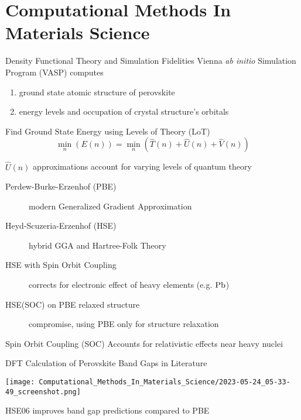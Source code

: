 \documentclass[10pt, aspectratio=169, presentation]{beamer}
\begin{document}
\section{Computational Methods In Materials Science}
\label{sec:org0c138b5}
\begin{frame}[label={sec:org1ee19d0}]{Density Functional Theory and Simulation Fidelities}
Vienna \emph{ab initio} Simulation Program (VASP)\autocite{kresse-1996-effic-iterat} computes
\begin{enumerate}
\item ground state atomic structure of perovskite
\item energy levels and occupation of crystal structure's orbitals
\end{enumerate}

\begin{block}{Find Ground State Energy using Levels of Theory (LoT)}
\[
\min_n(E(n)) = \min_n(\hat{T}(n) + \hat{U}(n) + \hat{V}(n))
\]

\(\hat{U}(n)\) approximations account for varying levels of quantum theory 

\begin{description}
\item[{Perdew-Burke-Erzenhof (PBE)}] modern Generalized Gradient Approximation
\item[{Heyd-Scuzeria-Erzenhof (HSE)}] hybrid GGA and Hartree-Folk Theory
\item[{HSE with Spin Orbit Coupling}] corrects for electronic effect of heavy elements (e.g. \(\ce{Pb}\))
\item[{HSE(SOC) on PBE relaxed structure}] compromise, using PBE only for structure relaxation
\end{description}

Spin Orbit Coupling (SOC) Accounts for relativistic effects near heavy nuclei
\end{block}
\end{frame}

\begin{frame}[label={sec:orgebb9776}]{DFT Calculation of Perovskite Band Gaps in Literature}
\begin{center}
\texttt{[image: Computational\_Methods\_In\_Materials\_Science/2023-05-24\_05-33-49\_screenshot.png]}
\end{center}

HSE06 improves band gap predictions compared to PBE\autocite{chan-2010-effic-band}
\end{frame}
\end{document}
